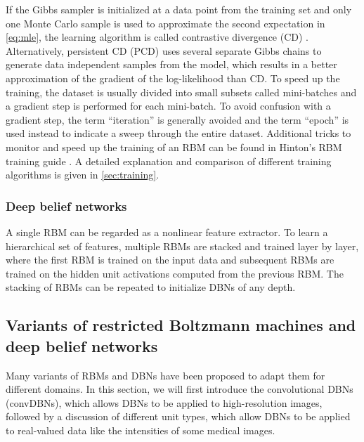 If the Gibbs sampler is initialized at a data point from the training set and
only one Monte Carlo sample is used to approximate the second expectation in
\eqref{eq:mle}, the learning algorithm is called contrastive divergence (CD)
\citep{hinton2002}. Alternatively, persistent CD (PCD) \citep{tieleman2008} uses
several separate Gibbs chains to generate data independent samples from the
model, which results in a better approximation of the gradient of the
log-likelihood than CD. To speed up the training, the dataset is usually divided
into small subsets called mini-batches and a gradient step is performed for each
mini-batch. To avoid confusion with a gradient step, the term ``iteration'' is
generally avoided and the term ``epoch'' is used instead to indicate a sweep
through the entire dataset. Additional tricks to monitor and speed up the
training of an RBM can be found in Hinton's RBM training guide
\citep{hinton2010a}. A detailed explanation and comparison of different training
algorithms is given in \ref{sec:training}.

\subsubsection{Deep belief networks}

%

A single RBM can be regarded as a nonlinear feature extractor. To learn a
hierarchical set of features, multiple RBMs are stacked and trained layer by
layer, where the first RBM is trained on the input data and subsequent RBMs are
trained on the hidden unit activations computed from the previous RBM. The
stacking of RBMs can be repeated to initialize DBNs of any depth.

\subsection{Variants of restricted Boltzmann machines and deep belief
networks}

Many variants of RBMs and DBNs have been proposed to adapt them for different
domains. In this section, we will first introduce the convolutional DBNs
(convDBNs), which allows DBNs to be applied to high-resolution images, followed
by a discussion of different unit types, which allow DBNs to be applied to
real-valued data like the intensities of some medical images.

